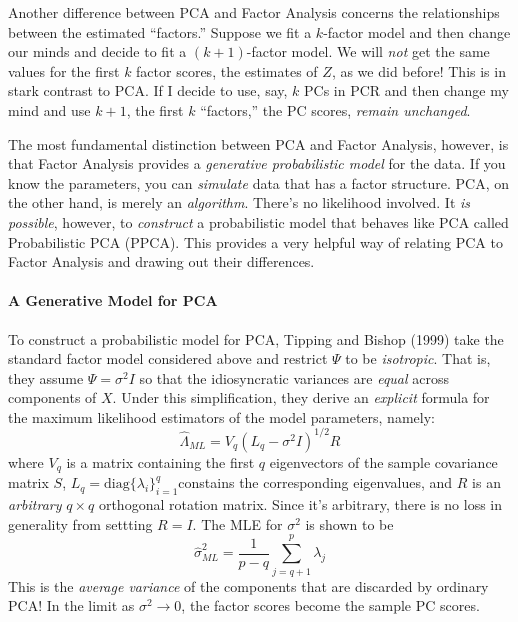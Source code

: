 Another difference between PCA and Factor Analysis concerns the relationships between the estimated ``factors.'' Suppose we fit a $k$-factor model and then change our minds and decide to fit a $(k+1)$-factor model. We will \emph{not} get the same values for the first $k$ factor scores, the estimates of $Z$, as we did before! This is in stark contrast to PCA. If I decide to use, say, $k$ PCs in PCR and then change my mind and use $k+1$, the first $k$ ``factors,'' the PC scores, \emph{remain unchanged}. 

The most fundamental distinction between PCA and Factor Analysis, however, is that Factor Analysis provides a \emph{generative probabilistic model} for the data. If you know the parameters, you can \emph{simulate} data that has a factor structure. PCA, on the other hand, is merely an \emph{algorithm}. There's no likelihood involved. It \emph{is possible}, however, to \emph{construct} a probabilistic model that behaves like PCA called Probabilistic PCA (PPCA). This provides a very helpful way of relating PCA to Factor Analysis and drawing out their differences.

\paragraph{A Generative Model for PCA}
To construct a probabilistic model for PCA, Tipping and Bishop (1999) take the standard factor model considered above and restrict $\Psi$ to be \emph{isotropic}. That is, they assume $\Psi = \sigma^2 I$ so that the idiosyncratic variances are \emph{equal} across components of $X$. Under this simplification, they derive an \emph{explicit} formula for the maximum likelihood estimators of the model parameters, namely:
$$\widehat{\Lambda}_{ML} = V_q(L_q - \sigma^2 I)^{1/2}R$$
where $V_q$ is a matrix containing the first $q$ eigenvectors of the sample covariance matrix $S$, $L_q = \mbox{diag}\{\lambda_i\}_{i=1}^q $constains the corresponding eigenvalues, and $R$ is an \emph{arbitrary} $q\times q$ orthogonal rotation matrix. Since it's arbitrary, there is no loss in generality from settting $R = I$. The MLE for $\sigma^2$ is shown to be
	$$\widehat{\sigma}^2_{ML} = \frac{1}{p - q} \sum_{j=q+1}^p \lambda_j$$
This is the \emph{average variance} of the components that are discarded by ordinary PCA! In the limit as $\sigma^2 \rightarrow 0$, the factor scores become the sample PC scores.


